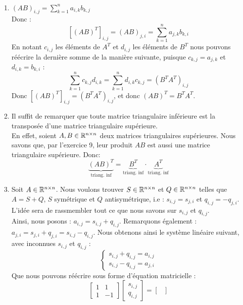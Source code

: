 \begin{exercice}
\, 
\begin{enumerate}
    \item $(AB)_{i,j}=\displaystyle\sum_{k=1}^{n}a_{i,k}b_{k,j}$ \\
    Donc :
    $$[(AB)^{T}]_{i,j}=(AB)_{j,i}=\sum_{k=1}^{n}a_{j,k}b_{k,i}$$
    En notant $c_{i,j}$ les éléments de $A^{T}$ et $d_{i,j}$ les éléments de $B^{T}$ nous pouvons réécrire la dernière somme de la manière suivante, puisque $c_{k,j} = a_{j,k}$ et $d_{i,k} = b_{k,i}$ :
    $$\sum_{k=1}^{n}c_{k,j}d_{i,k}=\sum_{k=1}^{n}d_{i,k}c_{k,j}=(B^{T}A^{T})_{i,j}$$
    Donc $[(AB)^T]_{i,j} = (B^T A^T)_{i,j}$, et donc $(AB)^T = B^T A^T$.
    \item Il suffit de remarquer que toute matrice triangulaire inférieure est la transposée d'une matrice triangulaire supérieure. \\
    En effet, soient $A,B \in \R^{n\cross n}$ deux matrices triangulaires supérieures. Nous savons que, par l'exercice 9, leur produit $AB$ est aussi une matrice triangulaire supérieure. Donc:
    $$\underbrace{(AB)^T}_{\text{triang. inf}} = \underbrace{B^T}_{\text{triang. inf}} \cdot  \underbrace{A^T}_{\text{triang. inf}}$$
    \item Soit $A \in \R^{n \cross n}$. Nous voulons trouver $S \in \R^{n \cross n}$ et $Q \in \R^{n \cross n}$ telles que $A = S+Q$, $S$ symétrique et $Q$ antisymétrique, i.e : $s_{i,j} = s_{j,i}$ et $q_{i,j} = -q_{j,i}$. L'idée sera de rassmembler tout ce que nous savons sur $s_{i,j}$ et $q_{i,j}$.\\
    Ainsi, nous posons : $a_{i,j} = s_{i,j} + q_{i,j}$. Remarquons également : $a_{j,i} = s_{j,i} + q_{j,i} = s_{i,j} - q_{i,j}$. Nous obtenons ainsi le système linéaire suivant, avec inconnues $s_{i,j}$ et $q_{i,j}$ :
    $$
    \begin{cases}
    s_{i,j} + q_{i,j} = a_{i,j}\\
    s_{i,j} - q_{i,j} = a_{j,i}
    \end{cases}
    $$
    Que nous pouvons réécrire sous forme d'équation matricielle :
    $$
    \begin{bmatrix}
    1 & 1\\
    1 & -1
    \end{bmatrix}\begin{bmatrix}
    s_{i,j} \\ q_{i,j}
    \end{bmatrix}=\begin{bmatrix}

\end{bmatrix}$$
\end{enumerate}
\end{exercice}
